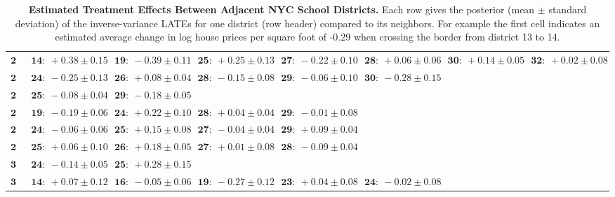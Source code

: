 \documentclass[letter,12pt]{article}
\begin{document}
\begin{landscape}
\begin{table}[!h]
\begin{tabular}{r|lllllll}
            \( \mathbf{24} \)& \( \mathbf{14:}~+0.38 \pm 0.15 \)& \( \mathbf{19:}~-0.39 \pm 0.11 \)& \( \mathbf{25:}~+0.25 \pm 0.13 \)& \( \mathbf{27:}~-0.22 \pm 0.10 \)& \( \mathbf{28:}~+0.06 \pm 0.06 \)& \( \mathbf{30:}~+0.14 \pm 0.05 \)& \( \mathbf{32:}~+0.02 \pm 0.08 \)\\ 
            \( \mathbf{25} \)& \( \mathbf{24:}~-0.25 \pm 0.13 \)& \( \mathbf{26:}~+0.08 \pm 0.04 \)& \( \mathbf{28:}~-0.15 \pm 0.08 \)& \( \mathbf{29:}~-0.06 \pm 0.10 \)& \( \mathbf{30:}~-0.28 \pm 0.15 \)\\ 
            \( \mathbf{26} \)& \( \mathbf{25:}~-0.08 \pm 0.04 \)& \( \mathbf{29:}~-0.18 \pm 0.05 \)\\ 
            \( \mathbf{27} \)& \( \mathbf{19:}~-0.19 \pm 0.06 \)& \( \mathbf{24:}~+0.22 \pm 0.10 \)& \( \mathbf{28:}~+0.04 \pm 0.04 \)& \( \mathbf{29:}~-0.01 \pm 0.08 \)\\ 
            \( \mathbf{28} \)& \( \mathbf{24:}~-0.06 \pm 0.06 \)& \( \mathbf{25:}~+0.15 \pm 0.08 \)& \( \mathbf{27:}~-0.04 \pm 0.04 \)& \( \mathbf{29:}~+0.09 \pm 0.04 \)\\ 
            \( \mathbf{29} \)& \( \mathbf{25:}~+0.06 \pm 0.10 \)& \( \mathbf{26:}~+0.18 \pm 0.05 \)& \( \mathbf{27:}~+0.01 \pm 0.08 \)& \( \mathbf{28:}~-0.09 \pm 0.04 \)\\ 
            \( \mathbf{30} \)& \( \mathbf{24:}~-0.14 \pm 0.05 \)& \( \mathbf{25:}~+0.28 \pm 0.15 \)\\ 
            \( \mathbf{32} \)& \( \mathbf{14:}~+0.07 \pm 0.12 \)& \( \mathbf{16:}~-0.05 \pm 0.06 \)& \( \mathbf{19:}~-0.27 \pm 0.12 \)& \( \mathbf{23:}~+0.04 \pm 0.08 \)& \( \mathbf{24:}~-0.02 \pm 0.08 \) \\
            \hline
        \end{tabular}
        \caption{
            \label{table:NYC_pairwise}
            \textbf{Estimated Treatment Effects Between Adjacent NYC School Districts.}
            Each row gives the posterior (mean $\pm$ standard deviation) of the inverse-variance LATEs for one district (row header) compared to its neighbors.
            For example the first cell indicates an estimated average change in log house prices per square foot of -0.29 when crossing the border from district 13 to 14.
        }
    \end{table}\end{landscape}
    \restoregeometry



\end{document}
